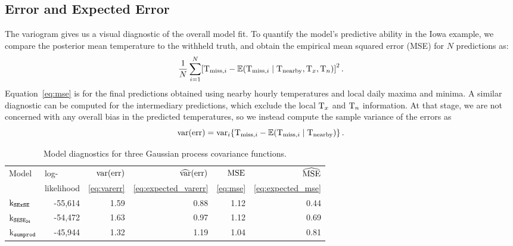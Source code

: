 \documentclass[12pt]{article}
\begin{document}
\subsection{Error and Expected Error}

The variogram gives us a visual diagnostic of the overall model fit. 
To quantify the model's predictive ability in the Iowa example, we compare the posterior mean temperature to the withheld truth, and obtain the empirical mean squared error (MSE) for $N$ predictions as:
\begin{equation}
    \label{eq:mse}
    \frac{1}{N} \sum_{i=1}^N \sbr{
        \T_{\miss,i}
        -
        \E\del{\T_{\miss,i} \mid \T_\obs,\Tx,\Tn}
}^2\,.
\end{equation}
Equation~\autoref{eq:mse} is for the final predictions obtained using nearby hourly temperatures and local daily maxima and minima.
A similar diagnostic can be computed for the intermediary predictions, which exclude the local \(\mathrm{T}_{x}\) and \(\mathrm{T}_{n}\) information.
At that stage, we are not concerned with any overall bias in the predicted temperatures, so we instead compute the sample variance of the errors as
\begin{equation}
    \var\del{\error} = \var_i \cbr{
        \T_{\miss,i}
        -
        \E\del{\T_{\miss,i} \mid \T_\obs}
    }\,.
    \label{eq:varerr}
\end{equation}

\begin{table}[tbp]
\begin{center}
\bgroup
\def\arraystretch{1.1}%
\begin{tabular}{lrrrrr}
\hline
Model & \multicolumn{1}{l}{log-} & \(\operatorname{{var}}(\mathrm{err})\) & \(\widehat{\operatorname{{var}}}(\mathrm{err})\) & \(\operatorname{{MSE}}\) & \(\widehat{\operatorname{{MSE}}}\) \\
& \multicolumn{1}{l}{likelihood} & \multicolumn{1}{c}{\autoref{eq:varerr}} & \multicolumn{1}{c}{\autoref{eq:expected_varerr}} & \multicolumn{1}{c}{\autoref{eq:mse}} & \multicolumn{1}{c}{\autoref{eq:expected_mse}} \\
\hline
\(\operatorname{k_{\mathtt{SExSE}}}\) & -55,614 & 1.59 & 0.88 & 1.12 & 0.44\\
\(\operatorname{k_{\mathtt{SESE_{24}}}}\) & -54,472 & 1.63 & 0.97 & 1.12 & 0.69\\
\(\operatorname{k_{\mathtt{sumprod}}}\) & -45,944 & 1.32 & 1.19 & 1.04 & 0.81\\
\hline
\end{tabular}
\caption{
    Model diagnostics for three Gaussian process covariance functions. 
    \label{table:diagnostics}
}
\egroup
\end{center}
\end{table}
\end{document}
